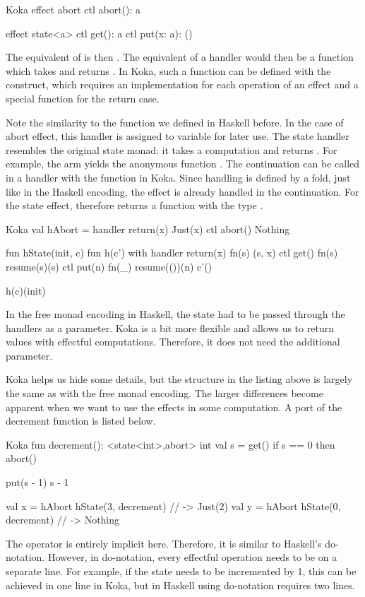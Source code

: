 \begin{lst}{Koka}
effect abort
  ctl abort(): a

effect state<a>
  ctl get(): a
  ctl put(x: a): ()
\end{lst}
%
The equivalent of  is then . The equivalent of a handler would then be a function which takes  and returns . In Koka, such a function can be defined with the  construct, which requires an implementation for each operation of an effect and a special function for the return case.

Note the similarity to the  function we defined in Haskell before. In the case of abort effect, this handler is assigned to variable for later use. The state handler resembles the original state monad: it takes a computation  and returns . For example, the  arm yields the anonymous function . The continuation can be called in a handler with the  function in Koka. Since handling is defined by a fold, just like in the Haskell encoding, the effect is already handled in the continuation. For the state effect,  therefore returns a function with the type .

\begin{lst}{Koka}
val hAbort = handler
  return(x)   Just(x)
  ctl abort() Nothing

fun hState(init, c)
  fun h(c')
    with handler
      return(x)  fn(s) (s, x)
      ctl get()  fn(s) resume(s)(s)
      ctl put(n) fn(_) resume(())(n)
    c'()
  
  h(c)(init)
\end{lst}
%
In the free monad encoding in Haskell, the state had to be passed through the handlers as a parameter. Koka is a bit more flexible and allows us to return values with effectful computations. Therefore, it does not need the additional parameter.

Koka helps us hide some details, but the structure in the listing above is largely the same as with the free monad encoding. The larger differences become apparent when we want to use the effects in some computation. A port of the decrement function is listed below.

\begin{lst}{Koka}
fun decrement(): <state<int>,abort> int
  val s = get()
  if s == 0 then
    abort()
  
  put(s - 1)
  s - 1 

val x = hAbort { hState(3, decrement) } // -> Just(2)
val y = hAbort { hState(0, decrement) } // -> Nothing
\end{lst}
%
The \hs{>>=} operator is entirely implicit here. Therefore, it is similar to Haskell's do-notation. However, in do-notation, every effectful operation needs to be on a separate line. For example, if the state needs to be incremented by 1, this can be achieved in one line in Koka, but in Haskell using do-notation requires two lines.

